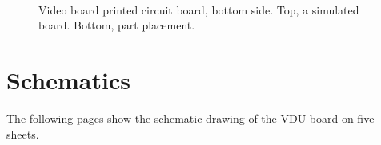 \begin{figure}
  \centering
  \\

  \caption{Video board printed circuit board, bottom side. Top, a
  simulated board. Bottom, part placement.}
\end{figure}


\htmlbreak\clearpage
\section{Schematics}

The following pages show the schematic drawing of the \gls{VDU} board on five sheets.

\cleardoublepage
{
  \def\schematicsFile{figs/video-max5}
}


